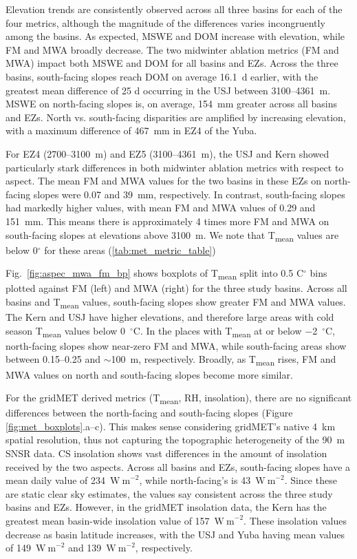 Elevation trends are consistently observed across all three basins for each of the four metrics, although the magnitude of the differences varies incongruently among the basins. As expected, MSWE and DOM increase with elevation, while FM and MWA broadly decrease. The two midwinter ablation metrics (FM and MWA) impact both MSWE and DOM for all basins and EZs. Across the three basins, south-facing slopes reach DOM on average 16.1~d earlier, with the greatest mean difference of 25 d occurring in the USJ between 3100--4361~m. MSWE on north-facing slopes is, on average, 154~mm greater across all basins and EZs. North vs. south-facing disparities are amplified by increasing elevation, with a maximum difference of 467~mm in EZ4 of the Yuba.

For EZ4 (2700--3100~m) and EZ5 (3100--4361~m), the USJ and Kern showed particularly stark differences in both midwinter ablation metrics with respect to aspect. The mean FM and MWA values for the two basins in these EZs on north-facing slopes were 0.07 and 39~mm, respectively. In contrast, south-facing slopes had markedly higher values, with mean FM and MWA values of 0.29 and 151~mm. This means there is approximately 4 times more FM and MWA on south-facing slopes at elevations above 3100~m. We note that T\textsubscript{mean} values are below 0$^{\circ}$ for these areas (\ref{tab:met_metric_table})

Fig.~\ref{fig:aspec_mwa_fm_bp} shows boxplots of T\textsubscript{mean} split into 0.5 C$^{\circ}$ bins plotted against FM (left) and MWA (right) for the three study basins. Across all basins and T\textsubscript{mean} values, south-facing slopes show greater FM and MWA values.  The Kern and USJ have higher elevations, and therefore large areas with cold season T\textsubscript{mean} values below 0~$^{\circ}$C. In the places with T\textsubscript{mean} at or below $-$2~$^{\circ}$C, north-facing slopes show near-zero FM and MWA, while south-facing areas show between 0.15--0.25 and $\sim$100~m, respectively. Broadly, as T\textsubscript{mean} rises, FM and MWA values on north and south-facing slopes become more similar.

For the gridMET derived metrics (T\textsubscript{mean}, RH, insolation), there are no significant differences between the north-facing and south-facing slopes (Figure \ref{fig:met_boxplots}.a--c). This makes sense considering gridMET's native 4~km spatial resolution, thus not capturing the topographic heterogeneity of the 90~m SNSR data. CS insolation shows vast differences in the amount of insolation received by the two aspects. Across all basins and EZs, south-facing slopes have a mean daily value of 234~$\mathrm{W~m}^{-2}$, while north-facing's is 43~$\mathrm{W~m}^{-2}$. Since these are static clear sky estimates, the values say consistent across the three study basins and EZs. However, in the gridMET insolation data, the Kern has the greatest mean basin-wide insolation value of 157~$\mathrm{W~m}^{-2}$. These insolation values decrease as basin latitude increases, with the USJ and Yuba having mean values of 149~$\mathrm{W~m}^{-2}$ and 139~$\mathrm{W~m}^{-2}$, respectively.


